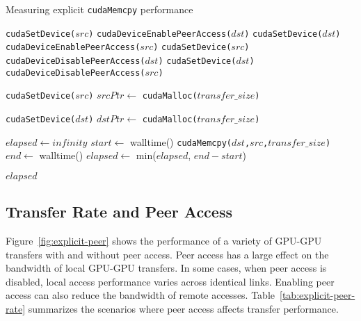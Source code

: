 \begin{algorithm}
    \caption{Measuring explicit \texttt{cudaMemcpy} performance}
    \label{alg:explicit}
    \begin{algorithmic}[1]
    \Statex
            \State \texttt{cudaSetDevice($src$)}
            \State \texttt{cudaDeviceEnablePeerAccess($dst$)}
            \State \texttt{cudaSetDevice($dst$)}
            \State \texttt{cudaDeviceEnablePeerAccess($src$)}
        \Else
            \State \texttt{cudaSetDevice($src$)}
            \State \texttt{cudaDeviceDisablePeerAccess($dst$)}
            \State \texttt{cudaSetDevice($dst$)}
            \State \texttt{cudaDeviceDisablePeerAccess($src$)}        
        \EndIf

        \State \texttt{cudaSetDevice($src$)} 
        \State $srcPtr \gets$ \texttt{cudaMalloc($transfer\_size$)}

        \State \texttt{cudaSetDevice($dst$)} 
        \State $dstPtr \gets$ \texttt{cudaMalloc($transfer\_size$)}

        \State $elapsed \gets infinity$ 
            \State $start \gets$ walltime()
            \State \texttt{cudaMemcpy($dst$,$src$,$transfer\_size$)}
            \State $end \gets$ walltime()
            \State $elapsed \gets$ min($elapsed$, $end-start$)
        \EndFor

    \Return $elapsed$
    \EndFunction

    \end{algorithmic}
\end{algorithm}

\subsection{Transfer Rate and Peer Access}
\label{sec:explicit-peer-bandwidth}

Figure~\ref{fig:explicit-peer} shows the performance of a variety of GPU-GPU transfers with and without peer access.
Peer access has a large effect on the bandwidth of local GPU-GPU transfers.
In some cases, when peer access is disabled, local access performance varies across identical links.
Enabling peer access can also reduce the bandwidth of remote accesses.
Table~\ref{tab:explicit-peer-rate} summarizes the scenarios where peer access affects transfer performance.

